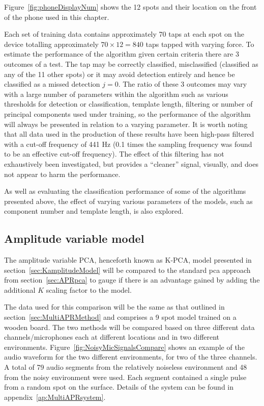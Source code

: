 Figure~\ref{fig:phoneDisplayNum} shows the 12 spots and their location on the front of the phone used in this chapter.

Each set of training data contains approximately 70 taps at each spot on the device totalling approximately $70 \times 12 = 840$ taps tapped with varying force. To estimate the performance of the algorithm given certain criteria there are 3 outcomes of a test. The tap may be correctly classified, misclassified (classified as any of the 11 other spots) or it may avoid detection entirely and hence be classified as a missed detection $j=0$. The ratio of these 3 outcomes may vary with a large number of parameters within the algorithm such as various thresholds for detection or classification, template length, filtering or number of principal components used under training, so the performance of the algorithm will always be presented in relation to a varying parameter. It is worth noting that all data used in the production of these results have been high-pass filtered with a cut-off frequency of 441 Hz (0.1 times the sampling frequency was found to be an effective cut-off frequency). The effect of this filtering has not exhaustively been investigated, but provides a ``cleaner'' signal, visually, and does not appear to harm the performance.

As well as evaluating the classification performance of some of the algorithms presented above, the effect of varying various parameters of the models, such as component number and template length, is also explored.

\subsection{Amplitude variable model}
The amplitude variable PCA, henceforth known as K-PCA, model presented in section~\ref{sec:KamplitudeModel} will be compared to the standard \gls{pca}  approach from section~\ref{sec:APRpca} to gauge if there is an advantage gained by adding the additional $K$ scaling factor to the model.

The data used for this comparison will be the same as that outlined in section~\ref{sec:MultiAPRMethod} and comprises a 9 spot model trained on a wooden board. The two methods will be compared based on three different data channels/microphones each at different locations and in two different environments. Figure~\ref{fig:NoisyMicSignalsCompare} shows an example of the audio waveform for the two different environments, for two of the three channels. A total of 79 audio segments from the relatively noiseless environment and 48 from the noisy environment were used. Each segment contained a single pulse from a random spot on the surface. Details of the system can be found in appendix~\ref{ap:MultiAPRsystem}.

